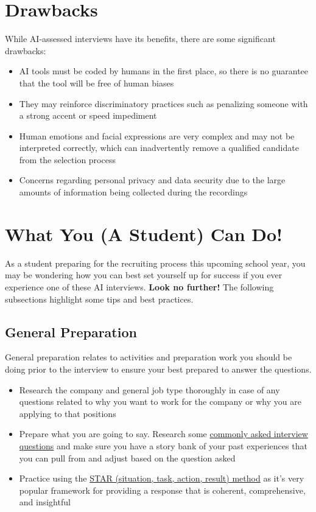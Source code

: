 \documentclass[
]{book}
\begin{document}
\hypertarget{drawbacks}{%
\section{Drawbacks}\label{drawbacks}}

While AI-assessed interviews have its benefits, there are some significant drawbacks:

\begin{itemize}
\item
  AI tools must be coded by humans in the first place, so there is no guarantee that the tool will be free of human biases
\item
  They may reinforce discriminatory practices such as penalizing someone with a strong accent or speed impediment
\item
  Human emotions and facial expressions are very complex and may not be interpreted correctly, which can inadvertently remove a qualified candidate from the selection process
\item
  Concerns regarding personal privacy and data security due to the large amounts of information being collected during the recordings
\end{itemize}

\hypertarget{what-you-a-student-can-do}{%
\section{What You (A Student) Can Do!}\label{what-you-a-student-can-do}}

As a student preparing for the recruiting process this upcoming school year, you may be wondering how you can best set yourself up for success if you ever experience one of these AI interviews. \textbf{Look no further!} The following subsections highlight some tips and best practices.

\hypertarget{general-preparation}{%
\subsection{General Preparation}\label{general-preparation}}

General preparation relates to activities and preparation work you should be doing prior to the interview to ensure your best prepared to answer the questions.

\begin{itemize}
\item
  Research the company and general job type thoroughly in case of any questions related to why you want to work for the company or why you are applying to that positions
\item
  Prepare what you are going to say. Research some \href{https://www.themuse.com/advice/interview-questions-and-answers}{commonly asked interview questions} and make sure you have a story bank of your past experiences that you can pull from and adjust based on the question asked
\item
  Practice using the \href{https://www.themuse.com/advice/star-interview-method}{STAR (situation, task, action, result) method} as it's very popular framework for providing a response that is coherent, comprehensive, and insightful
\end{itemize}
\end{document}
